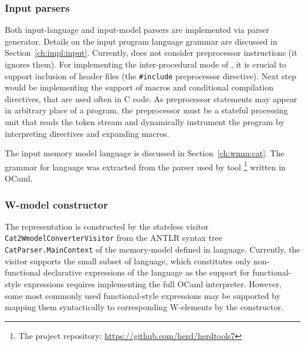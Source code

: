 
\subsubsection{Input parsers}
\label{ch:impl:proc:input-parser}

Both input-language and input-model parsers are implemented via  parser generator.
Details on the input program language grammar are discussed in Section~\ref{ch:impl:input}.
Currently, \porthos[2] does not consider preprocessor instructions (it ignores them).
For implementing the inter-procedural mode of \porthos{}, it is crucial to support inclusion of header files (the \texttt{\#include} preprocessor directive).
Next step would be implementing the support of macros and conditional compilation directives, that are used often in C code.
As preprocessor statements may appear in arbitrary place of a program, the preprocessor must be a stateful processing unit that reads the token stream and dynamically instrument the program by interpreting directives and expanding macros.

The input memory model language \cat{} is discussed in Section~\ref{ch:wmm:cat}.
The  grammar for \cat{} language was extracted from the parser used by  tool%
%
\footnote{The  project repository: \url{https://github.com/herd/herdtools7}} %
%
written in OCaml.



\subsubsection{W-model constructor}
\label{ch:impl:proc:w-constr}

The \wmodel{} representation is constructed by the stateless visitor \texttt{Cat2WmodelConverterVisitor} from the ANTLR syntax tree \texttt{CatParser.MainContext} of the memory-model defined in \cat{} language.
Currently, the visitor supports the small subset of \cat{} language, which constitutes only non-functional declarative expressions of the language as the support for functional-style expressions requires implementing the full OCaml interpreter.
However, some most commonly used functional-style expressions may be supported by mapping them syntactically to corresponding W-elements by the \wmodel{} constructor.

